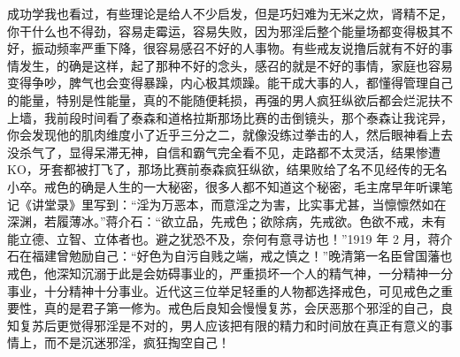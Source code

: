 \begin{case}
    成功学我也看过，有些理论是给人不少启发，但是巧妇难为无米之炊，肾精不足，你干什么也不得劲，容易走霉运，容易失败，因为邪淫后整个能量场都变得极其不好，振动频率严重下降，很容易感召不好的人事物。有些戒友说撸后就有不好的事情发生，的确是这样，起了那种不好的念头，感召的就是不好的事情，家庭也容易变得争吵，脾气也会变得暴躁，内心极其烦躁。能干成大事的人，都懂得管理自己的能量，特别是性能量，真的不能随便耗损，再强的男人疯狂纵欲后都会烂泥扶不上墙，我前段时间看了泰森和道格拉斯那场比赛的击倒镜头，那个泰森让我诧异，你会发现他的肌肉维度小了近乎三分之二，就像没练过拳击的人，然后眼神看上去没杀气了，显得呆滞无神，自信和霸气完全看不见，走路都不太灵活，结果惨遭 KO，牙套都被打飞了，那场比赛前泰森疯狂纵欲，结果败给了名不见经传的无名小卒。戒色的确是人生的一大秘密，很多人都不知道这个秘密，毛主席早年听课笔记《讲堂录》里写到：“淫为万恶本，而意淫之为害，比实事尤甚，当懔懔然如在深渊，若履薄冰。”蒋介石：“欲立品，先戒色；欲除病，先戒欲。色欲不戒，未有能立德、立智、立体者也。避之犹恐不及，奈何有意寻访也！”1919 年 2 月，蒋介石在福建曾勉励自己：“好色为自污自贱之端，戒之慎之！”晚清第一名臣曾国藩也戒色，他深知沉溺于此是会妨碍事业的，严重损坏一个人的精气神，一分精神一分事业，十分精神十分事业。近代这三位举足轻重的人物都选择戒色，可见戒色之重要性，真的是君子第一修为。戒色后良知会慢慢复苏，会厌恶那个邪淫的自己，良知复苏后更觉得邪淫是不对的，男人应该把有限的精力和时间放在真正有意义的事情上，而不是沉迷邪淫，疯狂掏空自己！
\end{case}

